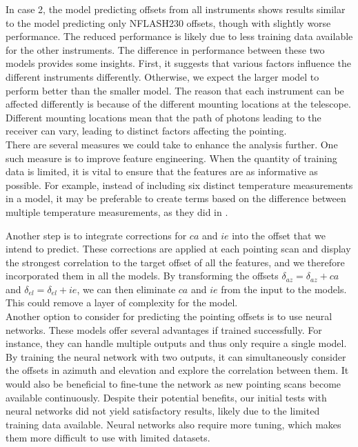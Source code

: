 In case 2, the model predicting offsets from all instruments shows results similar to the model predicting only NFLASH230 offsets, though with slightly worse performance.
The reduced performance is likely due to less training data available for the other instruments.
The difference in performance between these two models provides some insights.
First, it suggests that various factors influence the different instruments differently.
Otherwise, we expect the larger model to perform better than the smaller model.
The reason that each instrument can be affected differently is because of the different mounting locations at the telescope.
Different mounting locations mean that the path of photons leading to the receiver can vary, leading to distinct factors affecting the pointing.\\


There are several measures we could take to enhance the analysis further. One such measure is to improve feature engineering.
When the quantity of training data is limited, it is vital to ensure that the features are as informative as possible.
For example, instead of including six distinct temperature measurements in a model,
it may be preferable to create terms based on the difference between multiple temperature measurements, as they did in \cite{whitegreen2022}.

Another step is to integrate corrections for $ca$ and $ie$ into the offset that we intend to predict.
These corrections are applied at each pointing scan and display the strongest correlation to the target offset of all the features,
and we therefore incorporated them in all the models.
By transforming the offsets $\delta_{az}=\delta_{az} + ca$ and $\delta_{el}=\delta_{el} + ie$, we can then eliminate $ca$ and $ie$ from the input to the models.
This could remove a layer of complexity for the model.\\


Another option to consider for predicting the pointing offsets is to use neural networks.
These models offer several advantages if trained successfully.
For instance, they can handle multiple outputs and thus only require a single model.
By training the neural network with two outputs, it can simultaneously consider the offsets in azimuth and elevation and explore the correlation between them.
It would also be beneficial to fine-tune the network as new pointing scans become available continuously.
Despite their potential benefits, our initial tests with neural networks did not yield satisfactory results,
likely due to the limited training data available. Neural networks also require more tuning, which makes them more difficult to use with limited datasets.\\


